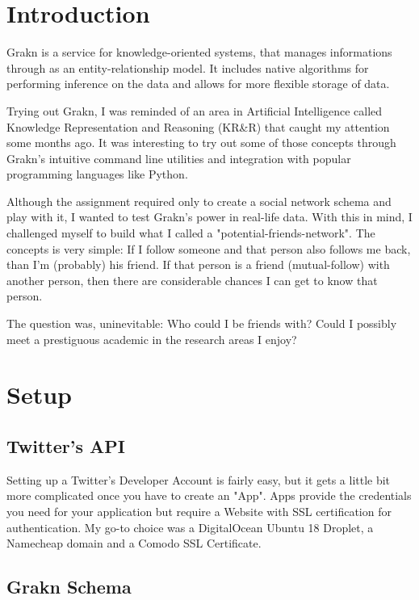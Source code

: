 \documentclass[a4 paper,12pt]{article}
\begin{document}

\section{Introduction}

Grakn is a service for knowledge-oriented systems, that manages informations through as an entity-relationship model. It includes native algorithms for performing inference on the data and allows for more flexible storage of data.

Trying out Grakn, I was reminded of an area in Artificial Intelligence called Knowledge Representation and Reasoning (KR\&R) that caught my attention some months ago. It was interesting to try out some of those concepts through Grakn's intuitive command line utilities and integration with popular programming languages like Python.

Although the assignment required only to create a social network schema and play with it, I wanted to test Grakn's power in real-life data. With this in mind, I challenged myself to build what I called a "potential-friends-network". The concepts is very simple: If I follow someone and that person also follows me back, than I'm (probably) his friend. If that person is a friend (mutual-follow) with another person, then there are considerable chances I can get to know that person. 

The question was, uninevitable: Who could I be friends with? Could I possibly meet a prestiguous academic in the research areas I enjoy?

\section{Setup}

\subsection{Twitter's API}

Setting up a Twitter's Developer Account is fairly easy, but it gets a little bit more complicated once you have to create an "App". Apps provide the credentials you need for your application but require a Website with SSL certification for authentication. My go-to choice was a DigitalOcean Ubuntu 18 Droplet, a Namecheap domain and a Comodo SSL Certificate. 

\subsection{Grakn Schema}
\end{document}
